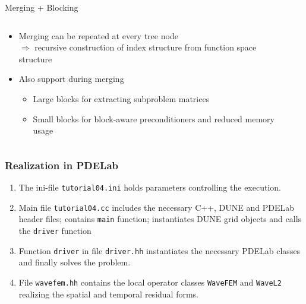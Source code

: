 \documentclass[ignorenonframetext,11pt]{beamer}
\theoremstyle{definition}
\begin{document}
\begin{frame}{Merging + Blocking}
  \begin{columns}
    \begin{column}{0.6\textwidth}
      \begin{itemize}
      \item Merging can be repeated at every tree node\\
{\small $\Rightarrow$ recursive construction of index structure from function space structure}
\item Also support  during merging
{\small
  \begin{itemize}
  \item Large blocks for extracting subproblem matrices
  \item Small blocks for block-aware preconditioners and
    reduced memory usage
  \end{itemize}
}
      \end{itemize}
\resizebox{\textwidth}{!}{


}
    \end{column}
    \begin{column}{0.4\textwidth}
\resizebox{0.8\textwidth}{!}{
  
}
\ \\[1em]
\resizebox{0.8\textwidth}{!}{
  
}

    \end{column}
  \end{columns}
\end{frame}

\begin{frame}
\frametitle{Realization in PDELab}
\begin{enumerate}[1)]
\item The ini-file
\lstinline{tutorial04.ini} holds parameters
controlling the execution.
\item Main file \lstinline{tutorial04.cc} includes the necessary C++,
DUNE and PDELab header files;
contains \lstinline{main} function;
instantiates DUNE grid objects and calls the \lstinline{driver} function
\item Function \lstinline{driver} in file \lstinline{driver.hh} instantiates
the necessary PDELab classes and finally solves the problem.
\item File \lstinline{wavefem.hh} contains the local operator classes
\lstinline{WaveFEM} and \lstinline{WaveL2} realizing the spatial
and temporal residual forms.
\end{enumerate}
\end{frame}

\begin{frame}


\end{frame}
\end{document}
